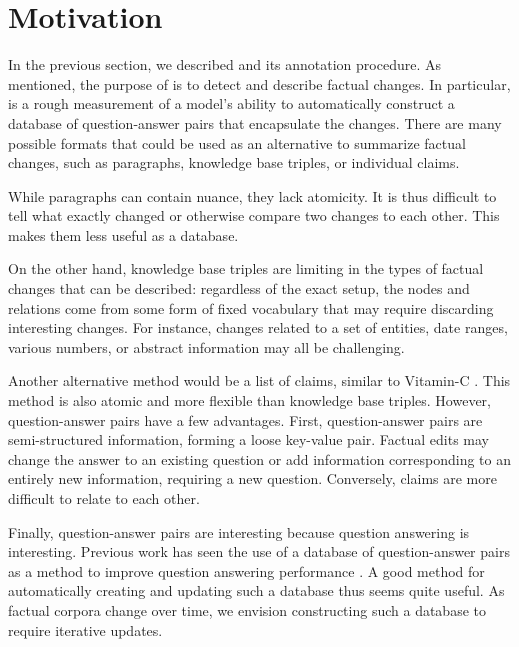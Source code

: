 \section{Motivation}
In the previous section, we described \dataset{} and its annotation procedure. As mentioned, the purpose of \dataset{} is to detect and describe factual changes. In particular, \dataset{} is a rough measurement of a model's ability to automatically construct a database of question-answer pairs that encapsulate the changes. There are many possible formats that could be used as an alternative to summarize factual changes, such as paragraphs, knowledge base triples, or individual claims.

While paragraphs can contain nuance, they lack atomicity. It is thus difficult to tell what exactly changed or otherwise compare two changes to each other. This makes them less useful as a database. 

On the other hand, knowledge base triples are limiting in the types of factual changes that can be described: regardless of the exact setup, the nodes and relations come from some form of fixed vocabulary that may require discarding interesting changes. For instance, changes related to a set of entities, date ranges, various numbers, or abstract information may all be challenging.

Another alternative method would be a list of claims, similar to Vitamin-C \citep{schuster-etal-2021-get}. This method is also atomic and more flexible than knowledge base triples. However, question-answer pairs have a few advantages. First, question-answer pairs are semi-structured information, forming a loose key-value pair. Factual edits may change the answer to an existing question or add information corresponding to an entirely new information, requiring a new question. Conversely, claims are more difficult to relate to each other.

Finally, question-answer pairs are interesting because question answering is interesting. Previous work has seen the use of a database of question-answer pairs as a method to improve question answering performance \citep{lewis-etal-2021-paq}. A good method for automatically creating and updating such a database thus seems quite useful. As factual corpora change over time, we envision constructing such a database to require iterative updates. 

